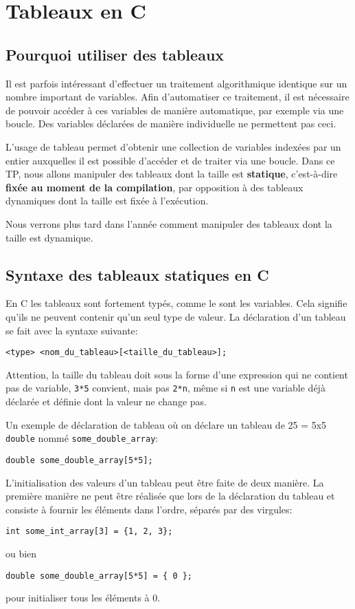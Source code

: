 \documentclass[11pt]{article}
\begin{document}
\section{Tableaux en C}
\label{sec:org82aef3c}
\subsection{Pourquoi utiliser des tableaux}
\label{sec:org139c1d7}
Il est parfois intéressant d'effectuer un traitement algorithmique identique sur un nombre important de variables. Afin d'automatiser ce traitement, il est nécessaire de pouvoir accéder à ces variables de manière automatique, par exemple via une boucle. Des variables déclarées de manière individuelle ne permettent pas ceci.

L'usage de tableau permet d'obtenir une collection de variables indexées par un entier auxquelles il est possible d'accéder et de traiter via une boucle.
Dans ce TP, nous allons manipuler des tableaux dont la taille est \textbf{statique}, c'est-à-dire \textbf{fixée au moment de la compilation}, par opposition à des tableaux dynamiques dont la taille est fixée à l'exécution.

Nous verrons plus tard dans l'année comment manipuler des tableaux dont la taille est dynamique.
\subsection{Syntaxe des tableaux statiques en C}
\label{sec:org90e42a2}
En C les tableaux sont fortement typés, comme le sont les variables. Cela signifie qu'ils ne peuvent contenir qu'un seul type de valeur.
La déclaration d'un tableau se fait avec la syntaxe suivante:
\begin{verbatim}
<type> <nom_du_tableau>[<taille_du_tableau>];
\end{verbatim}
Attention, la taille du tableau doit sous la forme d'une expression qui ne contient pas de variable, \texttt{3*5} convient, mais pas \texttt{2*n}, même si \texttt{n} est une variable déjà déclarée et définie dont la valeur ne change pas.

Un exemple de déclaration de tableau où on déclare un tableau de 25 = 5x5 \texttt{double} nommé \texttt{some\_double\_array}:
\begin{verbatim}
double some_double_array[5*5];
\end{verbatim}

L'initialisation des valeurs d'un tableau peut être faite de deux manière. La première manière ne peut être réalisée que lors de la déclaration du tableau et consiste à fournir les éléments dans l'ordre, séparés par des virgules:
\begin{verbatim}
int some_int_array[3] = {1, 2, 3};
\end{verbatim}
ou bien
\begin{verbatim}
double some_double_array[5*5] = { 0 };
\end{verbatim}
pour initialiser tous les éléments à 0.\\
\end{document}
